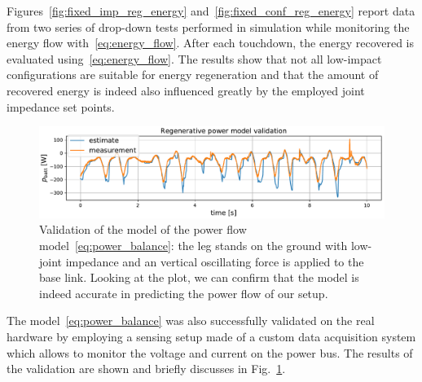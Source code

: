 Figures~\ref{fig:fixed_imp_reg_energy} and~\ref{fig:fixed_conf_reg_energy} report data from two series of drop-down tests performed in simulation while monitoring the energy flow with~\eqref{eq:energy_flow}. 
After each touchdown, the energy recovered is evaluated using~\eqref{eq:energy_flow}. The results show that not all low-impact configurations are suitable for energy regeneration and that the amount of recovered energy is indeed also influenced greatly by the employed joint impedance set points. 
\begin{figure}[t]
    \centering
    \includegraphics[width=1.0\columnwidth]{images/reg_pow_tracking.pdf}
    \caption{Validation of the model of the power flow model~\eqref{eq:power_balance}: the leg stands on the ground with low-joint impedance and an vertical oscillating force is applied to the base link. Looking at the plot, we can confirm that the model is indeed accurate in predicting the power flow of our setup.}
    \label{fig:reg_pow_model_tracking}
\end{figure}
The model~\eqref{eq:power_balance} was also successfully validated on the real hardware by employing a sensing setup made of a custom data acquisition system which allows to monitor the voltage and current on the power bus. The results of the validation are shown and briefly discusses in Fig.~\ref{fig:reg_pow_model_tracking}. 
